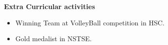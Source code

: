 \colorbox{titleColor}{\parbox{6.7in}{\textbf{Extra Curricular activities}}}
\begin{itemize}
  \setlength{\itemsep}{1pt}
  \item Winning Team at VolleyBall competition in HSC.
  \item Gold medalist in NSTSE.
\end{itemize}